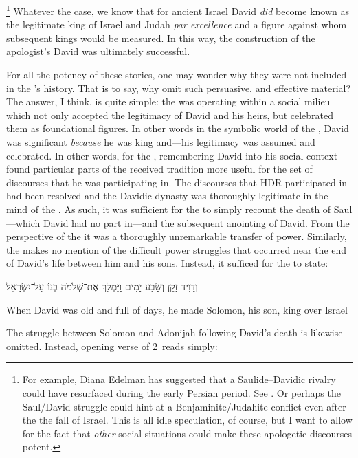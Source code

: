     \footnote{For example, Diana Edelman has suggested that a Saulide--Davidic rivalry could have resurfaced during the early Persian period. See \cite{edelman_dearman-graham2002}. Or perhaps the Saul/David struggle could hint at a Benjaminite/Judahite conflict even after the the fall of Israel. This is all idle speculation, of course, but I want to allow for the fact that \emph{other} social situations could make these apologetic discourses potent.}
Whatever the case, we know that for ancient Israel David \emph{did} become known as the legitimate king of Israel and Judah \emph{par excellence} and a figure against whom subsequent kings would be measured. In this way, the construction of the apologist's David was ultimately successful.%

For all the potency of these stories, one may wonder why they were not included in the \chronicler's history. That is to say, why omit such persuasive, and effective material? The answer, I think, is quite simple: the \chronicler was operating within a social milieu which not only accepted the legitimacy of David and his heirs, but celebrated them as foundational figures. In other words in the symbolic world of the \chronicler, David was significant \emph{because} he was king and---his legitimacy was assumed and celebrated. In other words, for the \chronicler, remembering David into his social context found particular parts of the received tradition more useful for the set of discourses that he was participating in. The discourses that HDR participated in had been resolved and the Davidic dynasty was thoroughly legitimate in the mind of the \chronicler. As such, it was sufficient for the \chronicler to simply recount the death of Saul---which David had no part in---and the subsequent anointing of David. From the perspective of the \chronicler it was a thoroughly unremarkable transfer of power. Similarly, the \chronicler makes no mention of the difficult power struggles that occurred near the end of David's life between him and his sons. Instead, it sufficed for the \chronicler to state: 
    \begin{hebrewtext}
        וְדָוִיד זָקֵן וְשָׂבַע יָמִים וַיַּמְלֵךְ אֶת־שְׁלֹמֹה בְנוֹ עַל־יִשְׂרָאֵל׃
    \end{hebrewtext}
    \begin{translation}
        When David was old and full of days, he made Solomon, his son, king over Israel
    \end{translation}
\noindent
The struggle between Solomon and Adonijah following David's death is likewise omitted. Instead, opening verse of 2~\chronicles reads simply:

